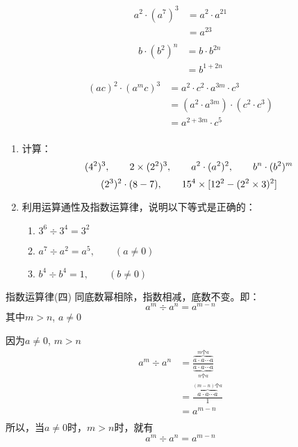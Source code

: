 \begin{solution}
\begin{align*}
            a^2\cdot (a^7)^3&=a^2\cdot a^{21} \tag{指数运算律（三）}\\
            &= a^{23} \tag{指数运算律（一）}\\
        \end{align*}
\begin{align*}
            b\cdot (b^2)^n&=b\cdot b^{2n} \tag{指数运算律（三）}\\
            &= b^{1+2n} \tag{指数运算律（一）}\\
        \end{align*}
\begin{align*}
            (ac)^2\cdot (a^m c)^3&=a^2\cdot c^2\cdot a^{3m}\cdot c^3 \tag{指数运算律（三）}\\
&=(a^2\cdot a^{3m})\cdot (c^2\cdot c^3) \tag{乘法交换、结合律}\\
            &= a^{2+3m}\cdot c^5 \tag{指数运算律（一）}\\
        \end{align*}        
\end{solution}

\begin{ex}
 \begin{enumerate}
     \item 计算：
           $$(4^2)^3,\qquad 2 \times (2^2)^3,\qquad a^2\cdot (a^2)^2,\qquad b^n\cdot (b^2)^m$$
       $$(2^3)^2 \cdot (8-7),\qquad       15^4 \times [12^2-(2^2 \times3)^2]$$
       \item 利用运算通性及指数运算律，说明以下等式是正确的：
 \begin{enumerate}
     \item $3^6\div 3^4=3^2$
     \item $a^7\div a^2=a^5,\qquad (a\ne 0)$
     \item $b^4\div b^4=1, \qquad (b\ne 0)$
 \end{enumerate}
     
 \end{enumerate}   
\end{ex}

\begin{blk}{指数运算律(四)}
    同底数幂相除，指数相减，底数不变。即：
\[a^m \div a^n=a^{m-n}\]
其中$m>n$,  $a\ne 0$
\end{blk}

\begin{rmk}
    因为$a\ne 0$, $m>n$
\begin{align*}
    a^m \div a^n&=\frac{\overbrace{a\cdot a\cdots a}^{\text{$m$个$a$}}}{\underbrace{a\cdot a\cdots a}_{\text{$n$个$a$}}}  \tag{乘方的意义}\\
    &=\frac{\overbrace{a\cdot a\cdots a}^{\text{$(m-n)$个$a$}}}{1}  \tag{除法的性质}\\
    &=a^{m-n}\tag{乘方的意义}\\
\end{align*}    
所以，当$a\ne 0$时，$m>n$时，就有
\[a^m \div a^n=a^{m-n}\]
\end{rmk}

